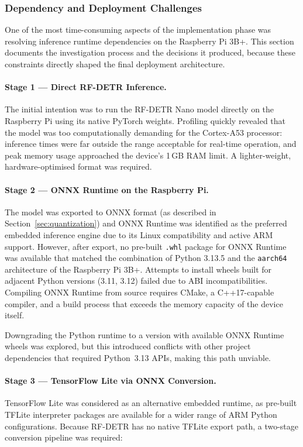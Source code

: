 \subsubsection{Dependency and Deployment Challenges}
\label{sec:dep_challenges}
 
One of the most time-consuming aspects of the implementation phase was
resolving inference runtime dependencies on the Raspberry Pi 3B+.
This section documents the investigation process and the decisions it
produced, because these constraints directly shaped the final
deployment architecture.
 
\paragraph{Stage 1 — Direct RF-DETR Inference.}
The initial intention was to run the RF-DETR Nano model directly on
the Raspberry Pi using its native PyTorch weights. Profiling quickly
revealed that the model was too computationally demanding for the
Cortex-A53 processor: inference times were far outside the range
acceptable for real-time operation, and peak memory usage approached
the device's 1\,GB RAM limit. A lighter-weight, hardware-optimised
format was required.
 
\paragraph{Stage 2 — ONNX Runtime on the Raspberry Pi.}
The model was exported to ONNX format (as described in
Section~\ref{sec:quantization}) and ONNX Runtime was identified as
the preferred embedded inference engine due to its Linux compatibility
and active ARM support. However, after export, no pre-built
\texttt{.whl} package for ONNX Runtime was available that matched
the combination of Python 3.13.5 and the \texttt{aarch64} architecture
of the Raspberry Pi 3B+. Attempts to install wheels built for adjacent
Python versions (3.11, 3.12) failed due to ABI incompatibilities.
Compiling ONNX Runtime from source requires CMake, a C++17-capable
compiler, and a build process that exceeds the memory capacity of the
device itself.
 
Downgrading the Python runtime to a version with available ONNX
Runtime wheels was explored, but this introduced conflicts with other
project dependencies that required Python~3.13 APIs, making this path
unviable.
 
\paragraph{Stage 3 — TensorFlow Lite via ONNX Conversion.}
TensorFlow Lite was considered as an alternative embedded runtime,
as pre-built TFLite interpreter packages are available for a wider
range of ARM Python configurations. Because RF-DETR has no native
TFLite export path, a two-stage conversion pipeline was required:
 
